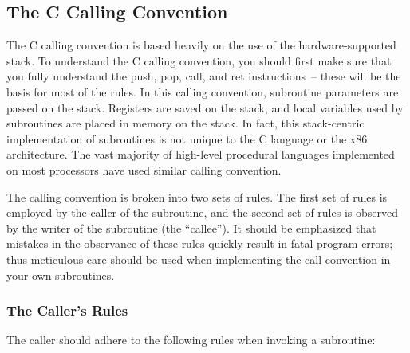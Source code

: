 \subsection{The C Calling Convention}

The C calling convention is based heavily on the use of the
hardware-supported stack. To understand the C calling convention, you
should first make sure that you fully understand the push, pop, call,
and ret instructions~-- these will be the basis for most of the rules.
In this calling convention, subroutine parameters are passed on the
stack. Registers are saved on the stack, and local variables used by
subroutines are placed in memory on the stack. In fact, this
stack-centric implementation of subroutines is not unique to the C
language or the x86 architecture. The vast majority of high-level
procedural languages implemented on most processors have used similar
calling convention.

The calling convention is broken into two sets of rules. The first set
of rules is employed by the caller of the subroutine, and the second
set of rules is observed by the writer of the subroutine (the
``callee''). It should be emphasized that mistakes in the observance
of these rules quickly result in fatal program errors; thus meticulous
care should be used when implementing the call convention in your own
subroutines.

\subsubsection{The Caller's Rules}

The caller should adhere to the following rules when invoking a
subroutine:

